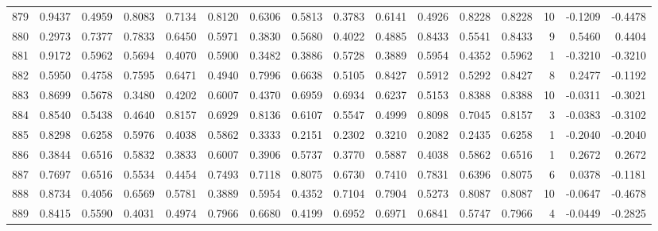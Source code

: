 \begin{tabular}{lrrrrrrrrrrrrrrr}
879 &      0.9437 &  0.4959 &  0.8083 &  0.7134 &  0.8120 &  0.6306 &  0.5813 &  0.3783 &  0.6141 &  0.4926 &   0.8228 &     0.8228 &     10 &                   -0.1209 &                    -0.4478 \\
880 &      0.2973 &  0.7377 &  0.7833 &  0.6450 &  0.5971 &  0.3830 &  0.5680 &  0.4022 &  0.4885 &  0.8433 &   0.5541 &     0.8433 &      9 &                    0.5460 &                     0.4404 \\
881 &      0.9172 &  0.5962 &  0.5694 &  0.4070 &  0.5900 &  0.3482 &  0.3886 &  0.5728 &  0.3889 &  0.5954 &   0.4352 &     0.5962 &      1 &                   -0.3210 &                    -0.3210 \\
882 &      0.5950 &  0.4758 &  0.7595 &  0.6471 &  0.4940 &  0.7996 &  0.6638 &  0.5105 &  0.8427 &  0.5912 &   0.5292 &     0.8427 &      8 &                    0.2477 &                    -0.1192 \\
883 &      0.8699 &  0.5678 &  0.3480 &  0.4202 &  0.6007 &  0.4370 &  0.6959 &  0.6934 &  0.6237 &  0.5153 &   0.8388 &     0.8388 &     10 &                   -0.0311 &                    -0.3021 \\
884 &      0.8540 &  0.5438 &  0.4640 &  0.8157 &  0.6929 &  0.8136 &  0.6107 &  0.5547 &  0.4999 &  0.8098 &   0.7045 &     0.8157 &      3 &                   -0.0383 &                    -0.3102 \\
885 &      0.8298 &  0.6258 &  0.5976 &  0.4038 &  0.5862 &  0.3333 &  0.2151 &  0.2302 &  0.3210 &  0.2082 &   0.2435 &     0.6258 &      1 &                   -0.2040 &                    -0.2040 \\
886 &      0.3844 &  0.6516 &  0.5832 &  0.3833 &  0.6007 &  0.3906 &  0.5737 &  0.3770 &  0.5887 &  0.4038 &   0.5862 &     0.6516 &      1 &                    0.2672 &                     0.2672 \\
887 &      0.7697 &  0.6516 &  0.5534 &  0.4454 &  0.7493 &  0.7118 &  0.8075 &  0.6730 &  0.7410 &  0.7831 &   0.6396 &     0.8075 &      6 &                    0.0378 &                    -0.1181 \\
888 &      0.8734 &  0.4056 &  0.6569 &  0.5781 &  0.3889 &  0.5954 &  0.4352 &  0.7104 &  0.7904 &  0.5273 &   0.8087 &     0.8087 &     10 &                   -0.0647 &                    -0.4678 \\
889 &      0.8415 &  0.5590 &  0.4031 &  0.4974 &  0.7966 &  0.6680 &  0.4199 &  0.6952 &  0.6971 &  0.6841 &   0.5747 &     0.7966 &      4 &                   -0.0449 &                    -0.2825 \\

\end{tabular}
